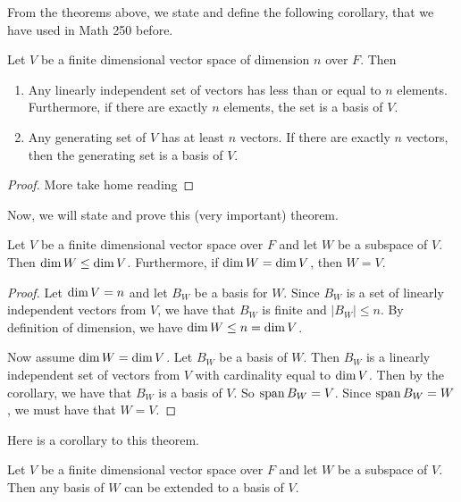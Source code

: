 \documentclass[main.tex]{subfiles}
\begin{document}
    From the theorems above, we state and define the following corollary, that we have used in Math 250 before.
    \begin{cor}{}{}
        Let $V$ be a finite dimensional vector space of dimension $n$ over $F$. Then
        \begin{enumerate}
            \item Any linearly independent set of vectors has less than or equal to $n$ elements. Furthermore, if there are exactly $n$ elements, the set is a basis of $V$.

            \item Any generating set of $V$ has at least $n$ vectors. If there are exactly $n$ vectors, then the generating set is a basis of $V$.
        \end{enumerate}
    \end{cor}
    \begin{proof}
        More take home reading
    \end{proof}

    Now, we will state and prove this (very important) theorem. 
    \begin{thrm}{}{}
        Let $V$ be a finite dimensional vector space over $F$ and let $W$ be a subspace of $V$. Then $\operatorname{dim} W \leq \operatorname{dim} V$. Furthermore, if $\operatorname{dim} W = \operatorname{dim} V$, then $W = V$.
    \end{thrm}
    \begin{proof}
        Let $\operatorname{dim} V = n$ and let $B_W$ be a basis for $W$. Since $B_W$ is a set of linearly independent vectors from $V$, we have that $B_W$ is finite and $|B_W| \leq n$. By definition of dimension, we have $\operatorname{dim} W \leq n = \operatorname{dim} V$. \par 

        Now assume $\operatorname{dim} W = \operatorname{dim} V$. Let $B_W$ be a basis of $W$. Then $B_W$ is a linearly independent set of vectors from $V$ with cardinality equal to $\operatorname{dim} V$. Then by the corollary, we have that $B_W$ is a basis of $V$. So $\operatorname{span} B_W = V$. Since $\operatorname{span} B_W = W$, we must have that $W = V$. 
    \end{proof}

    Here is a corollary to this theorem. 
    \begin{cor}{}{}
        Let $V$ be a finite dimensional vector space over $F$ and let $W$ be a subspace of $V$. Then any basis of $W$ can be extended to a basis of $V$.
    \end{cor}
\end{document}
